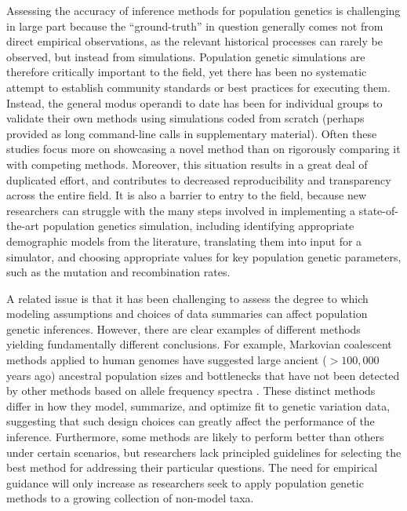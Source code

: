 \documentclass[12pt,halfline,a4paper]{ouparticle}
\begin{document}
Assessing the accuracy of inference methods for population genetics is
challenging in large part because the ``ground-truth'' in question
generally comes not from direct empirical observations, as the relevant
historical processes can rarely be observed, but instead from simulations.
Population genetic simulations are therefore critically important to the
field, yet there has been no systematic attempt to establish community
standards or best practices for executing them.
Instead, the general modus
operandi to date has been for individual groups to validate their own
methods using simulations coded from scratch
(perhaps provided as long command-line calls in supplementary material).
Often these studies focus more on showcasing a novel method than on
rigorously comparing it with competing methods.
Moreover, this situation results in a great deal of duplicated effort,
and contributes to decreased reproducibility and transparency across the entire field.
It is also a barrier to entry to the field, because new researchers can
struggle with the many steps involved
in implementing a state-of-the-art population genetics simulation,
including identifying appropriate demographic models from the literature,
translating them into input for a simulator, and choosing appropriate values for key population genetic parameters,
such as the mutation and recombination rates.

A related issue is that it has been challenging to assess the degree to which modeling assumptions
and choices of data summaries can affect population genetic inferences.
However, there are clear examples of different methods yielding fundamentally
different conclusions. For example, Markovian coalescent methods applied to human genomes have
suggested large ancient ($>100,000$ years ago) ancestral population sizes and
bottlenecks that have not been detected by other methods based on allele frequency spectra
\citep[see][]{beichman2017comparison}.
These distinct methods differ in how they model, summarize, and optimize fit to
genetic variation data, suggesting that such design choices can greatly affect the
performance of the inference. Furthermore, some methods are likely to
perform better than others under certain scenarios, but
researchers lack principled guidelines for selecting the best method for addressing
their particular questions. The need for empirical
guidance will only increase as researchers
seek to apply population genetic methods to a growing collection of non-model taxa.
\end{document}
